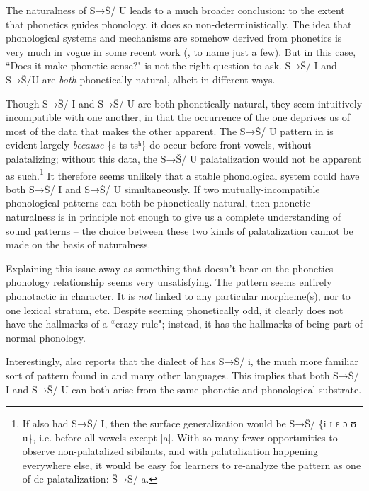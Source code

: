 The naturalness of S→Š/ {\longrule} U leads to a much broader conclusion: to the extent that phonetics guides phonology, it does so non-deterministically. The idea that phonological systems and mechanisms are somehow derived from phonetics is very much in vogue in some recent work (\citealt{Ohala1981,Ohala1990,Ohala:2004aa,Hayes1999,Steriade2008,Kawahara2008}, to name just a few). But in this case, ``Does it make phonetic sense?" is not the right question to ask. S→Š/ {\longrule} I and S→Š/{\longrule}U are \textit{both} phonetically natural, albeit in different ways.

Though S→Š/ {\longrule} I and S→Š/ {\longrule} U are both phonetically natural, they seem intuitively incompatible with one another, in that the occurrence of the one deprives us of most of the data that makes the other apparent. The S→Š/ {\longrule} U pattern in  is evident largely \textit{because} \{s ts tsʰ\} do occur before front vowels, without palatalizing; without this data, the S→Š/ {\longrule} U palatalization would not be apparent as such.\footnote{If  also had S→Š/ {\longrule} I, then the surface generalization would be S→Š/ {\longrule} \{i ɪ ɛ ɔ ʊ u\}, i.e. before all vowels except [a]. With so many fewer opportunities to observe non-palatalized sibilants, and with palatalization happening everywhere else, it would be easy for learners to re-analyze the pattern as one of de-palatalization: Š→S/ {\longrule} a.} It therefore seems unlikely that a stable phonological system could have both S→Š/ {\longrule} I and S→Š/ {\longrule} U simultaneously. If two mutually-incompatible phonological patterns can both be phonetically natural, then phonetic naturalness is in principle not enough to give us a complete understanding of sound patterns – the choice between these two kinds of palatalization cannot be made on the basis of naturalness.

Explaining this issue away as something that doesn’t bear on the phonetics-phonology relationship seems very unsatisfying. The  pattern seems entirely phonotactic in character. It is \textit{not} linked to any particular morpheme(s), nor to one lexical stratum, etc. Despite seeming phonetically odd, it clearly does not have the hallmarks of a ``crazy rule"; instead, it has the hallmarks of being part of normal phonology. 

Interestingly, \citet{Malepe1966} also reports that the  dialect of  has S→Š/ {\longrule} i, the much more familiar sort of pattern found in  and many other languages. This implies that both S→Š/ {\longrule} I and S→Š/ {\longrule} U can both arise from the same phonetic and phonological substrate. 

